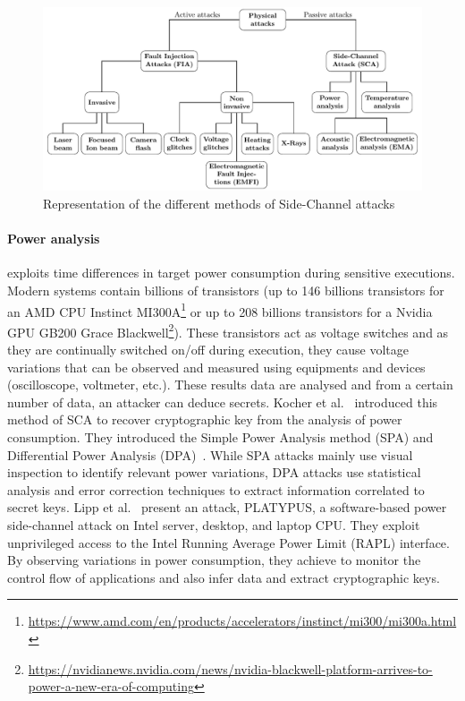 \begin{figure}[ht]
    \centering
    \includegraphics[page=3, width=.75\textwidth]{c2_soa/img/physicalAttacks.pdf}
    \caption{Representation of the different methods of Side-Channel attacks}
    \label{fig:sca}
\end{figure}

\paragraph{Power analysis} exploits time differences in target power consumption during sensitive executions. Modern systems contain billions of transistors (up to 146 billions transistors for an AMD CPU Instinct MI300A\footnote{\url{https://www.amd.com/en/products/accelerators/instinct/mi300/mi300a.html}} or up to 208 billions transistors for a Nvidia GPU GB200 Grace Blackwell\footnote{\url{https://nvidianews.nvidia.com/news/nvidia-blackwell-platform-arrives-to-power-a-new-era-of-computing}}). These transistors act as voltage switches and as they are continually switched on/off during execution, they cause voltage variations that can be observed and measured using equipments and devices (oscilloscope, voltmeter, etc.). These results data are analysed and from a certain number of data, an attacker can deduce secrets.
Kocher et al.~\cite{KJJ-98-crypto,KJJR-11-jce} introduced this method of SCA to recover cryptographic key from the analysis of power consumption. They introduced the Simple Power Analysis method (SPA) and Differential Power Analysis (DPA)~\cite{GP-99-ches}. While SPA attacks mainly use visual inspection to identify relevant power variations, DPA attacks use statistical analysis and error correction techniques to extract information correlated to secret keys.
Lipp et al.~\cite{LKOSECG-21-sp} present an attack, PLATYPUS, a software-based power side-channel attack on Intel server, desktop, and laptop CPU. They exploit unprivileged access to the Intel Running Average Power Limit (RAPL) interface. By observing variations in power consumption, they achieve to monitor the control flow of applications and also infer data and extract cryptographic keys.

